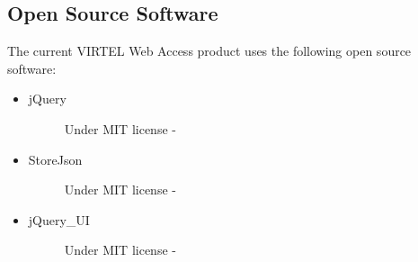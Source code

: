 \documentclass[letterpaper,10pt,english]{sphinxmanual}
\begin{document}
\subsection{Open Source Software}
\label{\detokenize{User_Guide:open-source-software}}
The current VIRTEL Web Access product uses the following open source software:
\begin{itemize}
\item {} \begin{description}
\item[{jQuery}] \leavevmode
Under MIT license - 

\end{description}

\item {} \begin{description}
\item[{StoreJson}] \leavevmode
Under MIT license - 

\end{description}

\item {} \begin{description}
\item[{jQuery\_UI}] \leavevmode
Under MIT license - 

\end{description}

\end{itemize}



\renewcommand{\indexname}{Index}
\printindex
\end{document}

